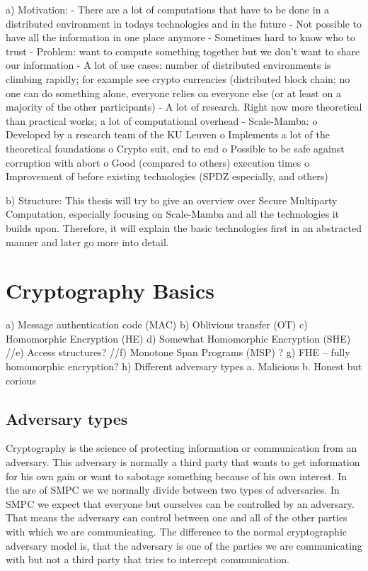 \documentclass[english,runningheads,a4paper]{llncs}[2018/03/10]
\begin{document}
a)	Motivation: 
-	There are a lot of computations that have to be done in a distributed environment in todays technologies and in the future
-	Not possible to have all the information in one place anymore
-	Sometimes hard to know who to trust 
-	Problem: want to compute something together but we don’t want to share our information
-	A lot of use cases: number of distributed environments is climbing rapidly; for example see crypto currencies (distributed block chain; no one can do something alone, everyone relies on everyone else (or at least on a majority of the other participants)
-	A lot of research. Right now more theoretical than practical works; a lot of computational overhead
-	Scale-Mamba: 
o	Developed by a research team of the KU Leuven
o	Implements a lot of the theoretical foundations
o	Crypto suit, end to end
o	Possible to be safe against corruption with abort
o	Good (compared to others) execution times
o	Improvement of before existing technologies (SPDZ especially, and others)


b)	Structure:
This thesis will try to give an overview over Secure Multiparty Computation, especially focusing on Scale-Mamba and all the technologies it builds upon. Therefore, it will explain the basic technologies first in an abstracted manner and later go more into detail. 




\section{Cryptography Basics}\label{sec:basics}
a)	Message authentication code (MAC)
b)	Oblivious transfer (OT)
c)	Homomorphic Encryption (HE)
d)	Somewhat Homomorphic Encryption (SHE)
//e)	Access structures?
//f)	Monotone Span Programs (MSP) ?
g)	FHE – fully homomorphic encryption?
h)	Different adversary types
a.	Malicious
b.	Honest but corious

\subsection{Adversary types}
Cryptography is the science of protecting information or communication from an adversary. This adversary is normally a third party that wants to get information for his own gain or want to sabotage something because of his own interest. In the are of SMPC we we normally divide between two types of adversaries. In SMPC we expect that everyone but ourselves can be controlled by an adversary.  That means the adversary can control between one and all of the other parties with which we are communicating. The difference to the normal cryptographic adversary model is, that the adversary is one of the parties we are communicating with but not a third party that tries to intercept communication.
\end{document}
